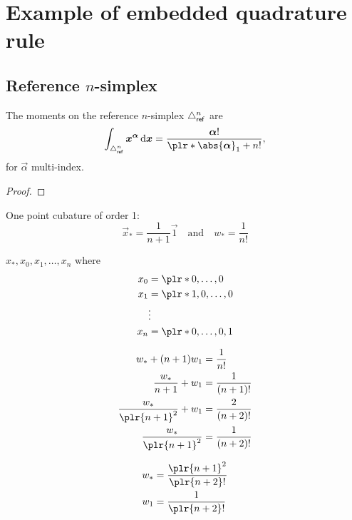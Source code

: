 
\section{Example of embedded quadrature rule}

\subsection{Reference \texorpdfstring{\(n\)}{n}-simplex}

\begin{lemma}
    The moments on the reference \(n\)-simplex \( \triangle_{\mathsf{ref}}^n \) are
    \[
        \int_{\Simplex_\Rf^n} \vec{x}^{\vec{\alpha}} \di{\vec{x}} = \frac{\vec{\alpha}!}{\plr*{\abs{\vec{\alpha}}_1 + n}!},
    \]
    for \( \vec{\alpha} \) multi-index.
\end{lemma}
\begin{proof}
\end{proof}

One point cubature of order 1:
\[
    \vec{x}_* = \frac{1}{n+1} \vec{1}
    \quad \text{and} \quad
    w_* = \frac{1}{n!}
\]

\( x_*, x_0, x_1, \ldots, x_n \) where
\begin{align*}
    x_0 & = \plr*{0, \ldots, 0}
    \\
    x_1 & = \plr*{1, 0, \ldots, 0}
    \\
        & \vdots
    \\
    x_n & = \plr*{0, \ldots, 0, 1}
\end{align*}

\begin{align*}
    w_* + (n+1) w_1               & = \frac{1}{n!}
    \\
    \frac{w_*}{n+1} + w_1         & = \frac{1}{(n+1)!}
    \\
    \frac{w_*}{\plr{n+1}^2} + w_1 & = \frac{2}{(n+2)!}
    \\
    \frac{w_*}{\plr{n+1}^2}       & = \frac{1}{(n+2)!}
\end{align*}

\begin{align*}
    w_* & = \frac{\plr{n+1}^2}{\plr{n+2}!}
    \\
    w_1 & = \frac{1}{\plr{n+2}!}
\end{align*}

